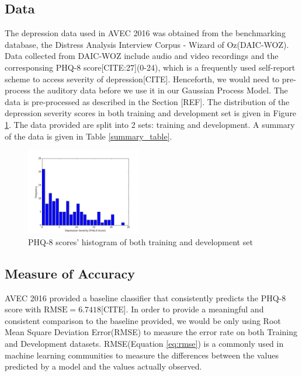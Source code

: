 \documentclass{article}
\begin{document}
	\subsection{Data}
	The depression data used in AVEC 2016 was obtained from the benchmarking database, the Distress Analysis Interview Corpus - Wizard of Oz(DAIC-WOZ). Data collected from DAIC-WOZ include audio and video recordings and the corresponsing PHQ-8 score[CITE:27](0-24), which is a frequently used self-report scheme to access severity of depression[CITE]. Henceforth, we would need to pre-process the auditory data before we use it in our Gaussian Process Model. The data is pre-processed as described in the Section [REF]. The distribution of the depression severity scores in both training and development set is given in Figure \ref{histogram_phq8}. The data provided are split into 2 sets: training and development. A summary of the data is given in Table \ref{summary_table}.
	\begin{figure}
  \includegraphics[width=0.45\textwidth]{histogram_phq8}
  \caption{PHQ-8 scores' histogram of both training and development set}
  \label{histogram_phq8}
 \end{figure}
 \subsection{Measure of Accuracy}
 AVEC 2016 provided a baseline classifier that consistently predicts the PHQ-8 score with $\text{RMSE}=6.7418$[CITE]. In order to provide a meaningful and consistent comparison to the baseline provided, we would be only using Root Mean Square Deviation Error(RMSE) to measure the error rate on both Training and Development datasets. RMSE(Equation \ref{eq:rmse}) is a commonly used in machine learning communities to measure the differences between the values predicted by a model and the values actually observed. 
\end{document}
